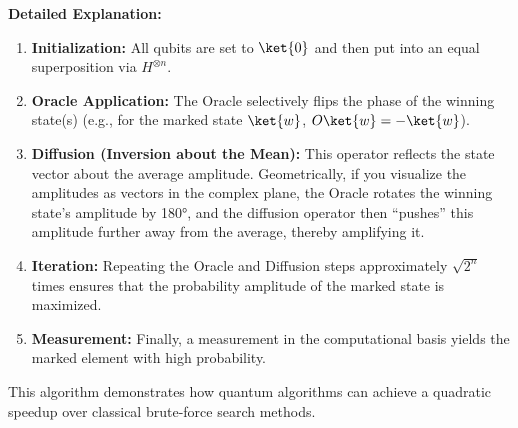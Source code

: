 \noindent
\textbf{Detailed Explanation:}
\begin{enumerate}
  \item \textbf{Initialization:} All qubits are set to \(\ket{0}\) and then
    put into an equal superposition via \(H^{\otimes n}\).

  \item \textbf{Oracle Application:} The Oracle selectively flips the phase
    of the winning state(s) (e.g., for the marked state \(\ket{w}\),
    \(O\ket{w} = -\ket{w}\)).

  \item \textbf{Diffusion (Inversion about the Mean):} This operator reflects
    the state vector about the average amplitude. Geometrically, if you
    visualize the amplitudes as vectors in the complex plane, the Oracle
    rotates the winning state's amplitude by 180°, and the diffusion operator
    then “pushes” this amplitude further away from the average, thereby
    amplifying it.

  \item \textbf{Iteration:} Repeating the Oracle and Diffusion steps
    approximately \( \sqrt{2^n} \) times ensures that the probability
    amplitude of the marked state is maximized.

  \item \textbf{Measurement:} Finally, a measurement in the computational
    basis yields the marked element with high probability.
\end{enumerate}

This algorithm demonstrates how quantum algorithms can achieve a quadratic
speedup over classical brute-force search methods.

